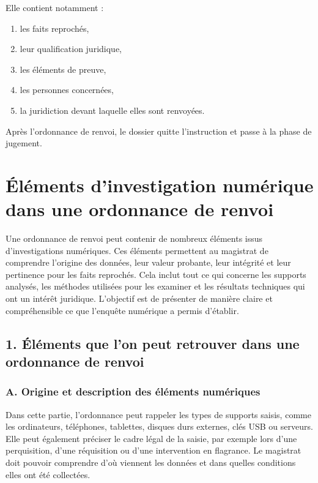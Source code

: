 \documentclass[12pt,a4paper]{report}
\begin{document}
	
	
	Elle contient notamment :
	\begin{enumerate}
	\item 	les faits reprochés,
	
	\item 	leur qualification juridique,
	
	\item 	les éléments de preuve,
	
	\item 	les personnes concernées,
	
	\item 	la juridiction devant laquelle elles sont renvoyées.
	
\end{enumerate}	

	Après l’ordonnance de renvoi, le dossier quitte l’instruction et passe à la phase de jugement.
	
 
	
\section*{Éléments d'investigation numérique dans une ordonnance de renvoi}

Une ordonnance de renvoi peut contenir de nombreux éléments issus d'investigations numériques. Ces éléments permettent au magistrat de comprendre l'origine des données, leur valeur probante, leur intégrité et leur pertinence pour les faits reprochés. Cela inclut tout ce qui concerne les supports analysés, les méthodes utilisées pour les examiner et les résultats techniques qui ont un intérêt juridique. L'objectif est de présenter de manière claire et compréhensible ce que l'enquête numérique a permis d'établir.

\subsection*{1. Éléments que l'on peut retrouver dans une ordonnance de renvoi}

\subsubsection*{A. Origine et description des éléments numériques}
Dans cette partie, l'ordonnance peut rappeler les types de supports saisis, comme les ordinateurs, téléphones, tablettes, disques durs externes, clés USB ou serveurs. Elle peut également préciser le cadre légal de la saisie, par exemple lors d'une perquisition, d'une réquisition ou d'une intervention en flagrance. Le magistrat doit pouvoir comprendre d'où viennent les données et dans quelles conditions elles ont été collectées.
\end{document}
